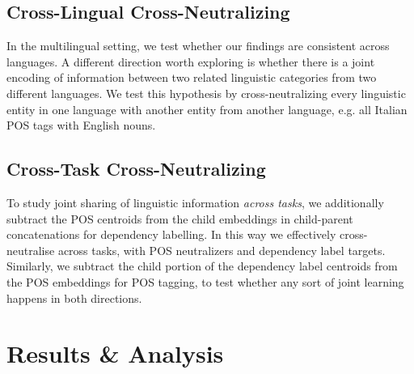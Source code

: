 \documentclass[11pt,a4paper]{article}
\begin{document}
\subsection{Cross-Lingual Cross-Neutralizing}
In the multilingual setting, we test whether our findings are consistent across languages. A different direction worth exploring is whether there is a joint encoding of information between two related linguistic categories from two different languages. We test this hypothesis by cross-neutralizing every linguistic entity in one language with another entity from another language, e.g. all Italian POS tags with English nouns. 


\subsection{Cross-Task Cross-Neutralizing}
To study joint sharing of linguistic information \textit{across tasks}, we additionally subtract the POS centroids from the child embeddings in child-parent concatenations for dependency labelling. In this way we effectively cross-neutralise across tasks, with POS neutralizers and dependency label targets. Similarly, we subtract the child portion of the dependency label centroids from the POS embeddings for POS tagging, to test whether any sort of joint learning happens in both directions.  

\section{Results \& Analysis}
\end{document}
